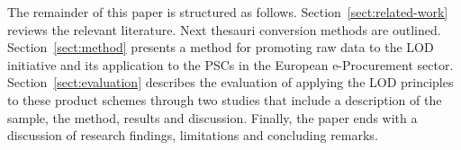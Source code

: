 The remainder of this paper is structured as follows. Section~\ref{sect:related-work} reviews the relevant literature. Next thesauri 
conversion methods are outlined. Section~\ref{sect:method} presents a method for promoting raw data to the LOD initiative 
and its application to the PSCs in the European e-Procurement sector. Section~\ref{sect:evaluation} describes the evaluation of applying the LOD principles to 
these product schemes through two studies that include a description of the sample, the method, results and discussion. Finally, 
the paper ends with a discussion of research findings, limitations and concluding remarks.
